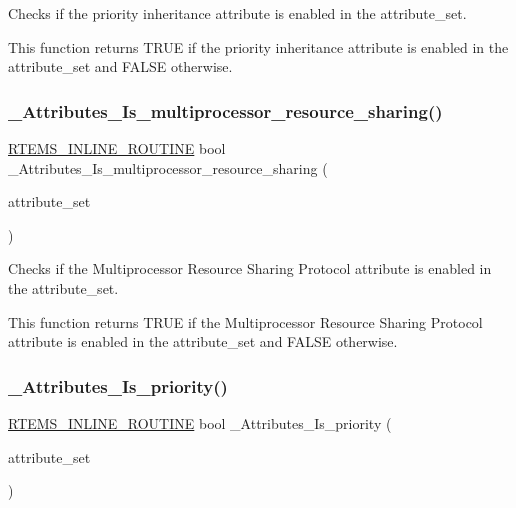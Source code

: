 Checks if the priority inheritance attribute is enabled in the attribute\+\_\+set. 

This function returns T\+R\+UE if the priority inheritance attribute is enabled in the attribute\+\_\+set and F\+A\+L\+SE otherwise. \mbox{\label{group__ClassicAttributesImpl_ga91bbfa6716bee0b1f32c25cc685baef4}} 
\subsubsection{\texorpdfstring{\_Attributes\_Is\_multiprocessor\_resource\_sharing()}{\_Attributes\_Is\_multiprocessor\_resource\_sharing()}}
{\footnotesize\ttfamily \mbox{\hyperlink{group__RTEMSScoreBaseDefs_gac216239df231d5dbd15e3520b0b9313f}{R\+T\+E\+M\+S\+\_\+\+I\+N\+L\+I\+N\+E\+\_\+\+R\+O\+U\+T\+I\+NE}} bool \+\_\+\+Attributes\+\_\+\+Is\+\_\+multiprocessor\+\_\+resource\+\_\+sharing (\begin{DoxyParamCaption}\item[{\mbox{\hyperlink{group__ClassicAttributes_gaea40313cf78ed843e09c4315d0a10f79}{rtems\+\_\+attribute}}}]{attribute\+\_\+set }\end{DoxyParamCaption})}



Checks if the Multiprocessor Resource Sharing Protocol attribute is enabled in the attribute\+\_\+set. 

This function returns T\+R\+UE if the Multiprocessor Resource Sharing Protocol attribute is enabled in the attribute\+\_\+set and F\+A\+L\+SE otherwise. \mbox{\label{group__ClassicAttributesImpl_ga54cc0d8f84115e7e29a83d3400398833}} 
\subsubsection{\texorpdfstring{\_Attributes\_Is\_priority()}{\_Attributes\_Is\_priority()}}
{\footnotesize\ttfamily \mbox{\hyperlink{group__RTEMSScoreBaseDefs_gac216239df231d5dbd15e3520b0b9313f}{R\+T\+E\+M\+S\+\_\+\+I\+N\+L\+I\+N\+E\+\_\+\+R\+O\+U\+T\+I\+NE}} bool \+\_\+\+Attributes\+\_\+\+Is\+\_\+priority (\begin{DoxyParamCaption}\item[{\mbox{\hyperlink{group__ClassicAttributes_gaea40313cf78ed843e09c4315d0a10f79}{rtems\+\_\+attribute}}}]{attribute\+\_\+set }\end{DoxyParamCaption})}



